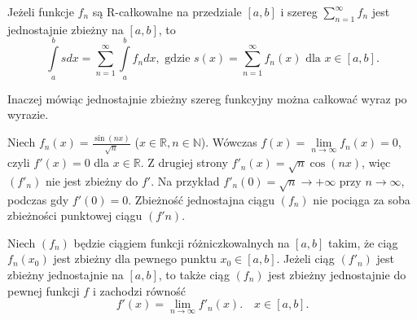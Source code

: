\documentclass[leqno]{article}
\begin{document}
\begin{justify}
\begin{wniosek}
{
    Jeżeli funkcje $f_n$ są R-całkowalne na przedziale $[a,b]$ i szereg $\sum\limits_{n=1}^{\infty}f_n$ jest jednostajnie zbieżny 
    na $[a,b]$, to
    \[
        \int\limits_{a}^{b}sdx = \sum\limits_{n=1}^{\infty}\int\limits_{a}^{b}f_n dx, \text{ gdzie } s(x) = \sum\limits_{n=1}^{\infty}f_n(x) \text{ dla } x \in [a,b].
    \]
}
\end{wniosek}

Inaczej mówiąc jednostajnie zbieżny szereg funkcyjny można całkować wyraz po wyrazie. 

\begin{ex}
    Niech $f_n(x) = \frac{\sin(nx)}{\sqrt{n}}$ ($x \in \mathbb{R}, n \in \mathbb{N}$). Wówczas 
    $f(x) = \lim\limits_{n \to \infty}f_n(x) = 0$, czyli $f'(x) = 0$ dla $x \in \mathbb{R}$. Z
    drugiej strony $f'_n(x) = \sqrt{n}\cos(nx)$, więc $(f'_n)$ nie jest zbieżny do $f'$. Na przykład
    $f'_n(0) = \sqrt{n} \to + \infty$ przy $n \to \infty$, podczas gdy $f'(0) = 0$. Zbieżność jednostajna ciągu $(f_n)$ nie pociąga
    za soba zbieżności punktowej ciągu $(f'n)$.
\end{ex}

\begin{theorem}
{
    Niech $(f_n)$ będzie ciągiem funkcji różniczkowalnych na $[a,b]$ takim, że ciąg $f_n(x_0)$ jest zbieżny 
    dla pewnego punktu $x_0 \in [a,b]$. Jeżeli ciąg $(f'_n)$ jest zbieżny jednostajnie na $[a,b]$, to także
    ciąg $(f_n)$ jest zbieżny jednostajnie do pewnej funkcji $f$ i zachodzi równość 
    \[
        f'(x) = \lim\limits_{n \to \infty}f'_n(x). \quad x \in [a,b].
    \]
}
\end{theorem}


\end{justify}
\end{document}
